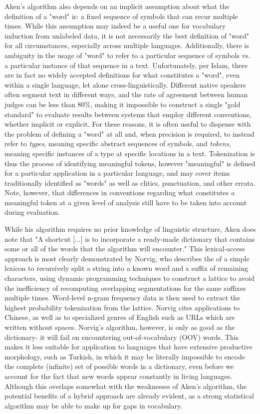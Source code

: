 Aken's algorithm also depends on an implicit assumption about what the definition of a "word" is: a fixed sequence of symbols that can recur multiple times. While this assumption may indeed be a useful one for vocabulary induction from unlabeled data, it is not necessarily the best definition of "word" for all circumstances, especially across multiple languages. Additionally, there is ambiguity in the usage of "word" to refer to a particular sequence of symbols vs. a particular instance of that sequence in a text. Unfortunately, per Islam\cite{islam07}, there are in fact no widely accepted definitions for what constitutes a "word", even within a single language, let alone cross-linguistically. Different native speakers often segment text in different ways, and the rate of agreement between human judges can be less than 80\%, making it impossible to construct a single "gold standard" to evaluate results between systems that employ different conventions, whether implicit or explicit.
For these reasons, it is often useful to dispense with the problem of defining a "word" at all and, when precision is required, to instead refer to \textit{types}, meaning specific abstract sequences of symbols, and \textit{tokens}, meaning specific instances of a type at specific locations in a text. Tokenization is thus the process of identifying meaningful tokens, however "meaningful" is defined for a particular application in a particular language, and may cover items traditionally identified as "words" as well as clitics, punctuation, and other errata. Note, however, that differences in conventions regarding what constitutes a meaningful token at a given level of analysis still have to be taken into account during evaluation.

While his algorithm requires no prior knowledge of linguistic structure, Aken\cite{aken11} does note that "A shortcut [...] is to incorporate a ready-made dictionary that contains some or all of the words that the algorithm will encounter." This lexical-access approach is most clearly demonstrated by Norvig\cite{norvig14}, who describes the of a simple lexicon to recursively split a string into a known word and a suffix of remaining characters, using dynamic programming techniques to construct a lattice to avoid the inefficiency of recomputing overlapping segmentations for the same suffixes multiple times. Word-level n-gram frequency data is then used to extract the highest probability tokenization from the lattice. Norvig\cite{norvig14} cites applications to Chinese, as well as to specialized genres of English such as URLs which are written without spaces.
Norvig's algorithm, however, is only as good as the dictionary- it will fail on encountering out-of-vocabulary (OOV) words. This makes it less suitable for application to languages that have extensive productive morphology, such as Turkish, in which it may be literally impossible to encode the complete (infinite) set of possible words in a dictionary, even before we account for the fact that new words appear constantly in living languages\cite{islam07}. Although this overlaps somewhat with the weaknesses of Aken's algorithm, the potential benefits of a hybrid approach are already evident, as a strong statistical algorithm may be able to make up for gaps in vocabulary.

